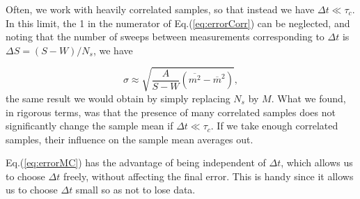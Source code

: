Often, we work with heavily correlated samples, so that instead we have $\Delta t \ll \tau_c$.
In this limit, the 1 in the numerator of Eq.(\ref{eq:errorCorr}) can be neglected, and noting that the number of sweeps between measurements corresponding to $\Delta t$ is $\Delta S = (S - W ) / N_s$, we have

\begin{equation}\label{eq:errorMC}
\sigma \approx \sqrt{ \frac{A}{S - W} ( \overline{m^2} - \overline{m}^2 )  }  ,
\end{equation}
the same result we would obtain by simply replacing $N_s$ by $M$.
What we found, in rigorous terms, was that the presence of many correlated samples does not significantly change the sample mean if $\Delta t \ll \tau_c$.
If we take enough correlated samples, their influence on the sample mean averages out.

Eq.(\ref{eq:errorMC}) has the advantage of being independent of $\Delta t$, which allows us to choose $\Delta t$ freely, without affecting the final error.
This is handy since it allows us to choose $\Delta t$ small so as not to lose data.
